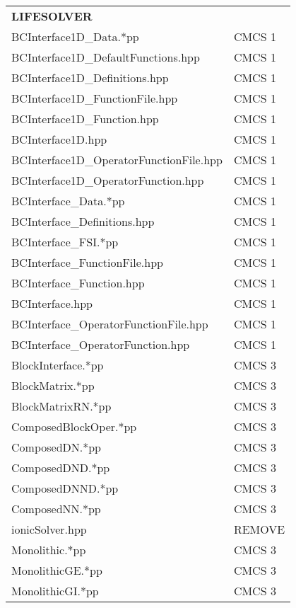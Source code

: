 \documentclass[10p]{article}
\theoremstyle{definition}
\begin{document}
\newpage
\begin{landscape}
\begin{table}[!h]
\fontsize{7}{7}\selectfont
\begin{multicols}{3}
\begin{xtabular}{
p{0.36\textwidth}<{}|
p{0.1\textwidth}<{}
}
\textbf{LIFESOLVER} \\
BCInterface1D\_Data.*pp & CMCS 1\\
BCInterface1D\_DefaultFunctions.hpp & CMCS 1\\
BCInterface1D\_Definitions.hpp & CMCS 1\\
BCInterface1D\_FunctionFile.hpp & CMCS 1\\
BCInterface1D\_Function.hpp & CMCS 1\\
BCInterface1D.hpp & CMCS 1\\
BCInterface1D\_OperatorFunctionFile.hpp & CMCS 1\\
BCInterface1D\_OperatorFunction.hpp & CMCS 1\\
BCInterface\_Data.*pp & CMCS 1\\
BCInterface\_Definitions.hpp & CMCS 1\\
BCInterface\_FSI.*pp & CMCS 1\\
BCInterface\_FunctionFile.hpp & CMCS 1\\
BCInterface\_Function.hpp & CMCS 1\\
BCInterface.hpp & CMCS 1\\
BCInterface\_OperatorFunctionFile.hpp & CMCS 1\\
BCInterface\_OperatorFunction.hpp & CMCS 1\\
BlockInterface.*pp & CMCS 3\\
BlockMatrix.*pp & CMCS 3\\
BlockMatrixRN.*pp & CMCS 3\\
ComposedBlockOper.*pp & CMCS 3\\
ComposedDN.*pp & CMCS 3\\
ComposedDND.*pp & CMCS 3\\
ComposedDNND.*pp & CMCS 3\\
ComposedNN.*pp & CMCS 3\\
ionicSolver.hpp & REMOVE\\
Monolithic.*pp & CMCS 3\\
MonolithicGE.*pp & CMCS 3\\
MonolithicGI.*pp & CMCS 3\\

\end{xtabular}
\end{multicols}
\end{table}
\end{landscape}
\end{document}
